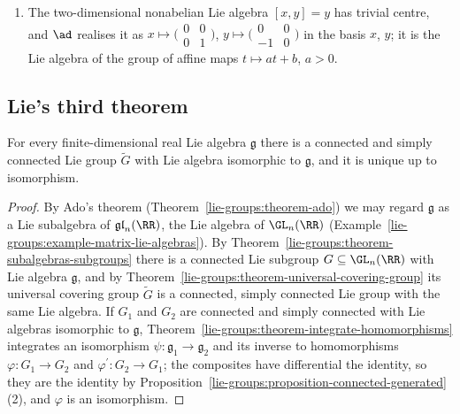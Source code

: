 \begin{example}
\begin{enumerate}
\item The two-dimensional nonabelian Lie algebra $[x, y] = y$ has trivial centre, and $\ad$ realises it as $x \mapsto \bigl(\begin{smallmatrix}0 & 0\\ 0 & 1\end{smallmatrix}\bigr)$,
$y \mapsto \bigl(\begin{smallmatrix}0 & 0\\ -1 & 0\end{smallmatrix}\bigr)$ in the basis $x$, $y$; it is the Lie algebra of the group of affine maps $t \mapsto at + b$, $a > 0$.
\end{enumerate}
\end{example}

\subsection{Lie's third theorem}\label{lie-groups:subsection-lie-third}

\begin{theorem}\label{lie-groups:theorem-lie-third}
For every finite-dimensional real Lie algebra $\mathfrak{g}$ there is a connected and simply connected Lie group $\widetilde{G}$ with Lie algebra isomorphic to $\mathfrak{g}$,
and it is unique up to isomorphism.
\end{theorem}

\begin{proof}
By Ado's theorem (Theorem~\ref{lie-groups:theorem-ado}) we may regard $\mathfrak{g}$ as a Lie subalgebra of $\mathfrak{gl}_n(\RR)$, the Lie algebra of $\GL_n(\RR)$
(Example~\ref{lie-groups:example-matrix-lie-algebras}). By Theorem~\ref{lie-groups:theorem-subalgebras-subgroups} there is a connected Lie subgroup
$G \subseteq \GL_n(\RR)$ with Lie algebra $\mathfrak{g}$, and by Theorem~\ref{lie-groups:theorem-universal-covering-group} its universal covering group $\widetilde{G}$ is a
connected, simply connected Lie group with the same Lie algebra. If $G_1$ and $G_2$ are connected and simply connected with Lie algebras isomorphic to $\mathfrak{g}$,
Theorem~\ref{lie-groups:theorem-integrate-homomorphisms} integrates an isomorphism $\psi \colon \mathfrak{g}_1 \to \mathfrak{g}_2$ and its inverse to homomorphisms
$\varphi \colon G_1 \to G_2$ and $\varphi^{\prime} \colon G_2 \to G_1$; the composites have differential the identity, so they are the identity by
Proposition~\ref{lie-groups:proposition-connected-generated}(2), and $\varphi$ is an isomorphism.
\end{proof}

